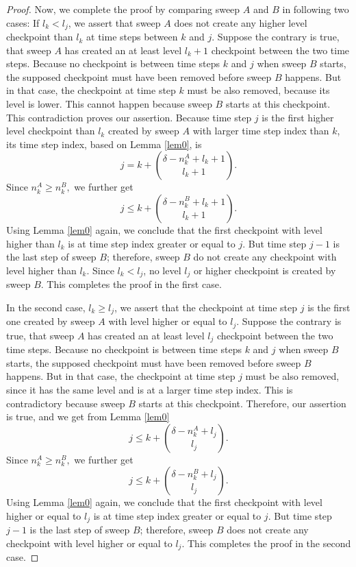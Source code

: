 \begin{proof}
    Now, we complete the proof by comparing sweep $A$ and $B$ in following two
    cases: If $l_k < l_j$, we assert that sweep $A$ does not create any
    higher level checkpoint than $l_k$ at time steps between $k$ and $j$.
    Suppose the contrary is true, that sweep $A$ has created an at
    least level $l_k + 1$ checkpoint between the two time steps.  Because no
    checkpoint is between time steps $k$ and $j$ when sweep $B$ starts,
    the supposed checkpoint must have been removed before sweep $B$ happens.
    But in that case, the checkpoint at time step $k$ must be also removed,
    because its level is lower.  This cannot happen because sweep $B$ starts
    at this checkpoint.  This contradiction proves our assertion.
    Because time step $j$ is the first higher level checkpoint than $l_k$
    created by sweep $A$ with larger time step index than $k$, its time step
    index, based on Lemma \ref{lem0}, is
    $$j = k + \binom{\delta - n_k^{A} + l_k + 1}{l_k + 1}.$$
    Since $ n_k^{A} \ge n_k^{B}, $ we further get
    $$j \le k + \binom{\delta - n_k^{B} + l_k + 1}{l_k + 1}.$$
    Using Lemma \ref{lem0} again, we conclude that the first checkpoint with
    level higher than $l_k$ is at time step index greater or equal to $j$.  But
    time step $j - 1$ is the last step of sweep $B$; therefore, sweep $B$ do
    not create any checkpoint with level higher than $l_k$.  Since $l_k < l_j$,
    no level $l_j$ or higher checkpoint is created by sweep $B$.  This
    completes the proof in the first case.

    In the second case, $l_k \ge l_j$, we assert that the checkpoint at time
    step $j$ is the first one created by sweep $A$ with level higher or equal to
    $l_j$.  Suppose the contrary is true, that sweep $A$ has created an at
    least level $l_j$ checkpoint between the two time steps.  Because no
    checkpoint is between time steps $k$ and $j$ when sweep $B$ starts,
    the supposed checkpoint must have been removed before sweep $B$ happens.
    But in that case, the checkpoint at time step $j$ must be also removed,
    since it has the same level and is at a larger time step index.
    This is contradictory because sweep $B$ starts at this checkpoint.
    Therefore, our assertion is true, and we get from Lemma \ref{lem0}
    $$j \le k + \binom{\delta - n_k^{A} + l_j}{l_j}.$$
    Since $ n_k^{A} \ge n_k^{B}, $ we further get
    $$j \le k + \binom{\delta - n_k^{B} + l_j}{l_j}.$$
    Using Lemma \ref{lem0} again, we conclude that the first checkpoint with
    level higher or equal to $l_j$ is at time step index greater or equal to
    $j$.  But time step $j - 1$ is the last step of sweep $B$; therefore, sweep
    $B$ does not create any checkpoint with level higher or equal to $l_j$.
    This completes the proof in the second case.
\end{proof}

